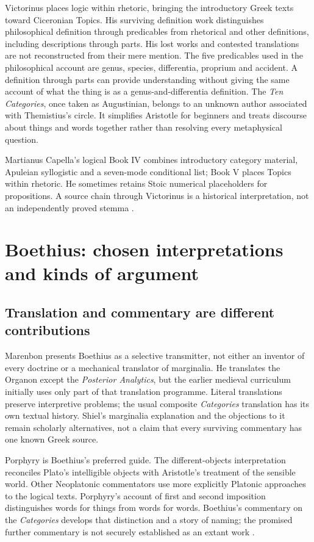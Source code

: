 Victorinus places logic within rhetoric, bringing the introductory Greek
texts toward Ciceronian Topics. His surviving definition work distinguishes
philosophical definition through predicables from rhetorical and other
definitions, including descriptions through parts. His lost works and
contested translations are not reconstructed from their mere mention.
The five predicables used in the philosophical account are genus,
species, differentia, proprium and accident. A definition through parts
can provide understanding without giving the same account of what
the thing is as a genus-and-differentia definition.
The \emph{Ten Categories}, once taken as Augustinian, belongs to an
unknown author associated with Themistius's circle. It simplifies
Aristotle for beginners and treats discourse about things and words
together rather than resolving every metaphysical question.

Martianus Capella's logical Book IV combines introductory category material,
Apuleian syllogistic and a seven-mode conditional list; Book V places
Topics within rhetoric. He sometimes retains Stoic numerical placeholders
for propositions. A source chain through Victorinus is a historical
interpretation, not an independently proved stemma
\cite[pp.~3--6]{Marenbon2007FordhamEarlyLatin}.

\section{Boethius: chosen interpretations and kinds of argument}
\label{sec:p13-early-latin-boethius}

\subsection{Translation and commentary are different contributions}

Marenbon presents Boethius as a selective transmitter, not either an
inventor of every doctrine or a mechanical translator of marginalia.
He translates the Organon except the \emph{Posterior Analytics},
but the earlier medieval curriculum initially uses only part of that
translation programme. Literal translations preserve interpretive
problems; the usual composite \emph{Categories} translation has its
own textual history. Shiel's marginalia explanation and the objections
to it remain scholarly alternatives, not a claim that every surviving
commentary has one known Greek source.

Porphyry is Boethius's preferred guide. The different-objects interpretation
reconciles Plato's intelligible objects with Aristotle's treatment of
the sensible world. Other Neoplatonic commentators use more explicitly
Platonic approaches to the logical texts. Porphyry's account of first
and second imposition distinguishes words for things from words for words.
Boethius's commentary on the \emph{Categories} develops that distinction
and a story of naming; the promised further commentary is not securely
established as an extant work
\cite[pp.~7--10]{Marenbon2007FordhamEarlyLatin}.

